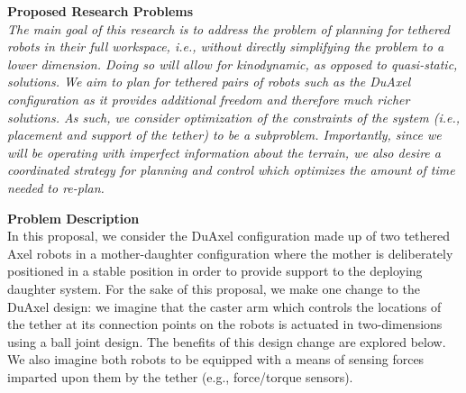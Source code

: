 \documentclass[12pt]{article}
\begin{document}
{\bf Proposed Research Problems \\}
{\sl The main goal of this research is to address the problem of planning for tethered robots in their 
full workspace, i.e., without directly simplifying the problem to a lower dimension. Doing so will allow 
for kinodynamic, as opposed to quasi-static, solutions. We aim to plan for tethered pairs of robots 
such as the DuAxel configuration as it provides additional freedom and therefore much richer solutions. 
As such, we consider optimization of the constraints of the system (i.e., placement and support of the tether) 
to be a subproblem. Importantly, since we will be operating with imperfect information about the terrain, we also 
desire a coordinated strategy for planning and control which optimizes the amount of time needed to re-plan. }

{\bf Problem Description \\}
In this proposal, we consider the DuAxel configuration made up of two tethered Axel robots in a mother-daughter
configuration where the mother is deliberately positioned in a stable position in order to provide support 
to the deploying daughter system. For the sake of this proposal, we make one change to the DuAxel design: 
we imagine that the caster arm which controls the locations of the tether at its connection points on the robots
is actuated in two-dimensions using a ball joint design. The benefits of this design change are explored below. 
We also imagine both robots to be equipped with a means of sensing forces imparted upon them by the tether 
(e.g., force/torque sensors).
\end{document}

